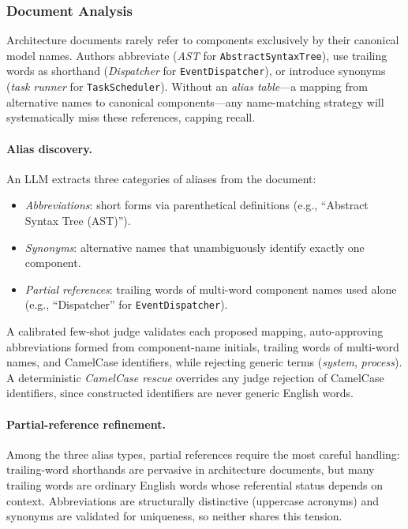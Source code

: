 \subsubsection{Document Analysis}\label{sec:doc-analysis}

Architecture documents rarely refer to components exclusively by their
canonical model names.
Authors abbreviate (\emph{AST} for \texttt{AbstractSyntaxTree}),
use trailing words as shorthand (\emph{Dispatcher} for
\texttt{EventDispatcher}), or introduce synonyms (\emph{task runner}
for \texttt{TaskScheduler}).
Without an \emph{alias table}---a mapping from alternative names to
canonical components---any name-matching strategy will systematically
miss these references, capping recall.

\paragraph{Alias discovery.}
An LLM extracts three categories of aliases from the document:
\begin{itemize}
    \item \emph{Abbreviations}: short forms via parenthetical
      definitions (e.g., ``Abstract Syntax Tree (AST)'').
    \item \emph{Synonyms}: alternative names that unambiguously
      identify exactly one component.
    \item \emph{Partial references}: trailing words of multi-word
      component names used alone (e.g., ``Dispatcher'' for
      \texttt{EventDispatcher}).
\end{itemize}

\noindent A calibrated few-shot judge validates each proposed mapping,
auto-approving abbreviations formed from component-name initials,
trailing words of multi-word names, and CamelCase identifiers, while
rejecting generic terms (\emph{system}, \emph{process}).
A deterministic \emph{CamelCase rescue} overrides any judge rejection
of CamelCase identifiers, since constructed identifiers are never
generic English words.

\paragraph{Partial-reference refinement.}
Among the three alias types, partial references require the most
careful handling: trailing-word shorthands are pervasive in
architecture documents, but many trailing words are ordinary English
words whose referential status depends on context.
Abbreviations are structurally distinctive (uppercase acronyms) and
synonyms are validated for uniqueness, so neither shares this tension.

